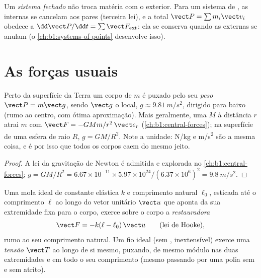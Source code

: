 \begin{definition}\label{def:b1:newton-dynamics:conservation}
Um \emph{sistema fechado} não troca matéria com o exterior. Para um
sistema de , as  internas se cancelam aos pares (terceira lei),
e a  total $\vect P = \sum m_i\vect v_i$ obedece a
$\dd\vect P/\dd t = \sum\vect F_{\mathrm{ext}}$: ela se conserva quando
as  externas se anulam (o \cref{ch:b1:systems-of-points} desenvolve
isso).
\end{definition}

\section{As forças usuais}

\begin{proposition}\label{prop:b1:newton-dynamics:weight}
Perto da superfície da Terra um corpo de  $m$ é puxado pelo seu
\emph{peso} $\vect P = m\vect g$, sendo $\vect g$ o 
local, $g \approx \qty{9.81}{m/s^2}$, dirigido para baixo (rumo ao
centro, com ótima aproximação). Mais geralmente, uma  $M$ à distância $r$ atrai
$m$ com $\vect F = -GMm/r^2\,\vect e_r$ (\cref{ch:b1:central-forces});
na superfície de uma esfera de raio $R$, $g = GM/R^2$. Note a unidade:
\unit{N/kg} e \unit{m/s^2} são a mesma coisa, e é por isso que todos os corpos caem
do mesmo jeito.
\end{proposition}

\begin{proof}
A lei da gravitação de Newton é admitida e explorada no
\cref{ch:b1:central-forces}; $g = GM/R^2 = 6.67\times10^{-11} \times
5.97\times10^{24}/(6.37\times10^6)^2 = \qty{9.8}{m/s^2}$.
\end{proof}

\begin{proposition}\label{prop:b1:newton-dynamics:springstring}
Uma mola ideal de constante elástica $k$ e comprimento natural $\ell_0$, esticada
até o comprimento $\ell$ ao longo do vetor unitário $\vect u$ que aponta da sua extremidade
fixa para o corpo, exerce sobre o corpo a \emph{ restauradora}
\[
\vect F = -k(\ell - \ell_0)\,\vect u \qquad (\text{lei de Hooke}),
\]
rumo ao seu comprimento natural. Um fio ideal (sem , inextensível)
exerce uma \emph{tensão} $\vect T$ ao longo de si mesmo, puxando, de mesmo
módulo nas duas extremidades e em todo o seu comprimento (mesmo passando por uma polia
sem  e sem atrito).
\end{proposition}

